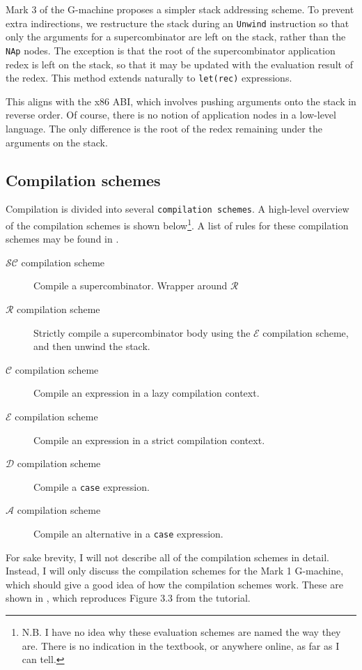 Mark 3 of the G-machine proposes a simpler stack addressing scheme. To prevent extra indirections, we restructure the stack during an \texttt{Unwind} instruction so that only the arguments for a supercombinator are left on the stack, rather than the \texttt{NAp} nodes. The exception is that the root of the supercombinator application redex is left on the stack, so that it may be updated with the evaluation result of the redex. This method extends naturally to \texttt{let(rec)} expressions.

This aligns with the x86 ABI, which involves pushing arguments onto the stack in reverse order. Of course, there is no notion of application nodes in a low-level language. The only difference is the root of the redex remaining under the arguments on the stack.

\subsection{Compilation schemes}
\label{sec:compilation-schemes}

Compilation is divided into several \texttt{compilation schemes}. A high-level overview of the compilation schemes is shown below\footnote{N.B. I have no idea why these evaluation schemes are named the way they are. There is no indication in the textbook, or anywhere online, as far as I can tell.}. A list of rules for these compilation schemes may be found in \cite{johnsson1984efficient}.

\begin{description}
\item[$\mathcal{SC}$ compilation scheme] Compile a supercombinator. Wrapper around $\mathcal{R}$
\item[$\mathcal{R}$ compilation scheme] Strictly compile a supercombinator body using the $\mathcal{E}$ compilation scheme, and then unwind the stack.
\item[$\mathcal{C}$ compilation scheme] Compile an expression in a lazy compilation context.
\item[$\mathcal{E}$ compilation scheme] Compile an expression in a strict compilation context.
\item[$\mathcal{D}$ compilation scheme] Compile a \texttt{case} expression.
\item[$\mathcal{A}$ compilation scheme] Compile an alternative in a \texttt{case} expression.
\end{description}

For sake brevity, I will not describe all of the compilation schemes in detail. Instead, I will only discuss the compilation schemes for the Mark 1 G-machine, which should give a good idea of how the compilation schemes work. These are shown in , which reproduces Figure 3.3 from the tutorial.

